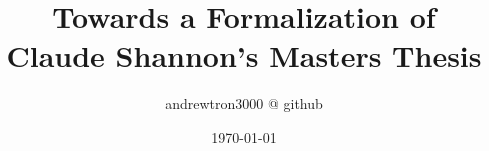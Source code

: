 \documentclass[11pt,twocolumn]{article}
\title{Towards a Formalization of \\ Claude Shannon's Masters Thesis}
\author{andrewtron3000 @ github}
\date{\today}
\begin{document}
\maketitle
\begin{abstract}

\end{abstract}
\end{document}
